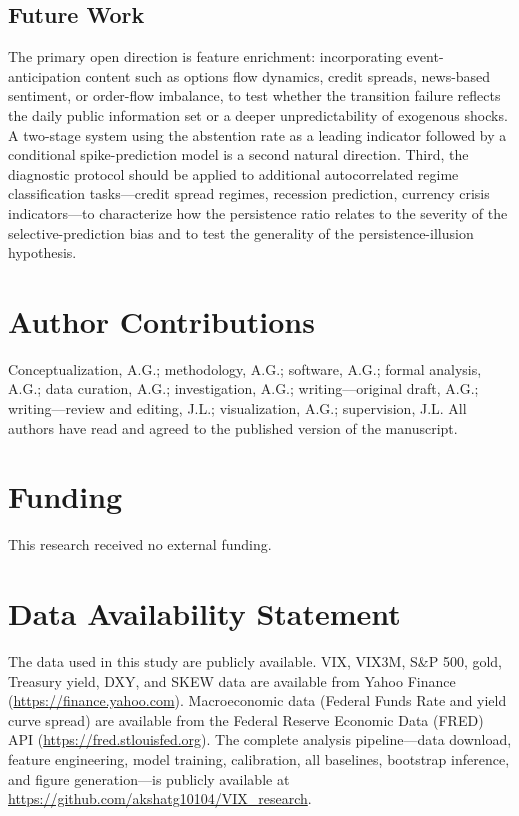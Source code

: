 \documentclass[12pt]{article}
\begin{document}
\subsection*{Future Work}

The primary open direction is feature enrichment: incorporating event-anticipation content such
as options flow dynamics, credit spreads, news-based sentiment, or order-flow imbalance, to
test whether the transition failure reflects the daily public information set or a deeper
unpredictability of exogenous shocks. A two-stage system using the abstention rate as a leading
indicator followed by a conditional spike-prediction model is a second natural direction. Third,
the diagnostic protocol should be applied to additional autocorrelated regime classification
tasks---credit spread regimes, recession prediction, currency crisis indicators---to
characterize how the persistence ratio relates to the severity of the selective-prediction
bias and to test the generality of the persistence-illusion hypothesis.


\section*{Author Contributions}

Conceptualization, A.G.; methodology, A.G.; software, A.G.; formal analysis, A.G.; data
curation, A.G.; investigation, A.G.; writing---original draft, A.G.; writing---review and
editing, J.L.; visualization, A.G.; supervision, J.L. All authors have read and agreed to the
published version of the manuscript.

\section*{Funding}

This research received no external funding.

\section*{Data Availability Statement}

The data used in this study are publicly available. VIX, VIX3M, S\&P 500, gold, Treasury yield,
DXY, and SKEW data are available from Yahoo Finance (\url{https://finance.yahoo.com}).
Macroeconomic data (Federal Funds Rate and yield curve spread) are available from the Federal
Reserve Economic Data (FRED) API (\url{https://fred.stlouisfed.org}). The complete analysis
pipeline---data download, feature engineering, model training, calibration, all baselines,
bootstrap inference, and figure generation---is publicly available at
\url{https://github.com/akshatg10104/VIX_research}.
\end{document}
